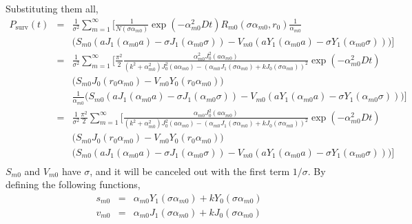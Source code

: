 \documentclass{article}
\begin{document}
%
Substituting them all,
%
\begin{eqnarray}
        P_{\mathrm{surv}}(t)
    &=& \frac{1}{\sigma^2} \sum_{m=1}^{\infty} \Bigg[
        \frac{1}{N(\sigma\alpha_{m0})} \exp(-\alpha_{m0}^2Dt)
        R_{m0}(\sigma\alpha_{m0}, r_0)
        \frac{1}{\alpha_{m0}}
        \nonumber\\
    & & \Big(
        S_{m0} \left(aJ_1(\alpha_{m0}a) - \sigma J_1(\alpha_{m0}\sigma)\right) -
        V_{m0} \left(aY_1(\alpha_{m0}a) - \sigma Y_1(\alpha_{m0}\sigma)\right)
        \Big)
        \Bigg] \nonumber\\
    &=& \frac{1}{\sigma^2} \sum_{m=1}^{\infty}
    \Bigg[
        \frac{\pi^2}{2}
        \frac{\alpha_{m0}^2 J^2_0(a\alpha_{m0})}
             {(k^2 + \alpha_{m0}^2) J_0^2(a\alpha_{m0}) -
              (\alpha_{m0}J_1(\sigma\alpha_{m0}) + kJ_0(\sigma\alpha_{m0}))^2}
        \exp(-\alpha_{m0}^2Dt)
        \nonumber\\
    & & \Big(S_{m0}J_0(r_0\alpha_{m0}) - V_{m0}Y_0(r_0\alpha_{m0})\Big)
        \nonumber\\
    & & \frac{1}{\alpha_{m0}}\Big(
        S_{m0} \left(aJ_1(\alpha_{m0}a) - \sigma J_1(\alpha_{m0}\sigma)\right) -
        V_{m0} \left(aY_1(\alpha_{m0}a) - \sigma Y_1(\alpha_{m0}\sigma)\right)
        \Big)
    \Bigg] \nonumber\\
    &=& \frac{1}{\sigma^2}\frac{\pi^2}{2} \sum_{m=1}^{\infty}
    \Bigg[
        \frac{\alpha_{m0} J^2_0(a\alpha_{m0})}
             {(k^2 + \alpha_{m0}^2) J_0^2(a\alpha_{m0}) -
              (\alpha_{m0}J_1(\sigma\alpha_{m0}) + kJ_0(\sigma\alpha_{m0}))^2}
        \exp(-\alpha_{m0}^2Dt)
        \nonumber\\
    & & \Big(S_{m0}J_0(r_0\alpha_{m0}) - V_{m0}Y_0(r_0\alpha_{m0})\Big)
        \nonumber\\
    & & \Big(
        S_{m0} \left(aJ_1(\alpha_{m0}a) - \sigma J_1(\alpha_{m0}\sigma)\right) -
        V_{m0} \left(aY_1(\alpha_{m0}a) - \sigma Y_1(\alpha_{m0}\sigma)\right)
        \Big)
    \Bigg] \nonumber\\
\end{eqnarray}
%
$S_{m0}$ and $V_{m0}$ have $\sigma$, and it will be canceled out with the first term $1/\sigma$.
By defining the following functions,
%
\begin{eqnarray}
    s_{m0} &=& \alpha_{m0}Y_1(\sigma\alpha_{m0}) + kY_0(\sigma\alpha_{m0}) \\
    v_{m0} &=& \alpha_{m0}J_1(\sigma\alpha_{m0}) + kJ_0(\sigma\alpha_{m0})
\end{eqnarray}
\end{document}
